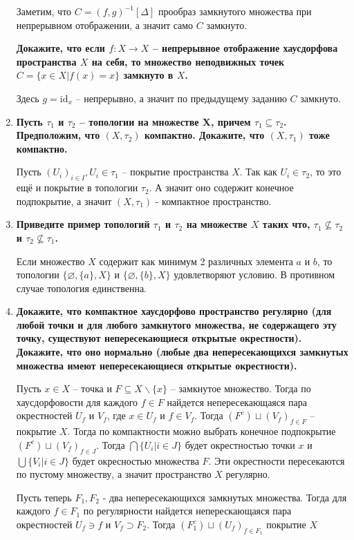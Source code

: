 \documentclass{article}
\begin{document}
\begin{enumerate}
        Заметим, что $C = (f, g)^{-1}[\Delta]$ прообраз замкнутого множества
        при непрерывном отображении, а значит само $C$ замкнуто.\par
        \textbf{Докажите, что если $f:X\longrightarrow X$ – непрерывное
        отображение хаусдорфова пространства $X$ на себя, то множество
        неподвижных точек $C=\{x\in X|f(x)=x\}$ замкнуто в $X$.}\par
        Здесь $g=\text{id}_x$ – непрерывно, а значит по предыдущему заданию $C$
        замкнуто.
    \item \textbf{Пусть $\tau_1$ и $\tau_2$ – топологии на множестве X, причем
        $\tau_1\subseteq \tau_2$. Предположим, что $(X, \tau_2)$ компактно.
        Докажите, что $(X, \tau_1)$ тоже компактно.}\par
        Пусть $(U_i)_{i\in I}, U_i \in \tau_1$ – покрытие пространства  $X$.
        Так как $U_i\in\tau_2$, то это ещё и покрытие в топологии $\tau_2$. А
        значит оно содержит конечное подпокрытие, а значит $(X, \tau_1)$ -
        компактное пространство.
    \item \textbf{Приведите пример топологий $\tau_1$ и $\tau_2$ на множестве
        $X$ таких что, $\tau_1\nsubseteq\tau_2$ и $\tau_2\nsubseteq\tau_1$.}\par
        Если множество $X$ содержит как минимум 2 различных элемента $a$ и $b$,
        то топологии $\{\varnothing, \{a\}, X\}$ и $\{\varnothing, \{b\}, X\}$
        удовлетворяют условию. В противном случае топология единственна.
    \item \textbf{Докажите, что компактное хаусдорфово пространство регулярно
        (для любой точки и для любого замкнутого множества, не содержащего эту
        точку, существуют непересекающиеся открытые окрестности). Докажите, что
        оно нормально (любые два непересекающихся замкнутых множества имеют
        непересекающиеся открытые окрестности).}\par Пусть $x\in X$ – точка и
        $F\subseteq X\backslash\{x\}$ – замкнутое множество. Тогда по хаусдорфовости
        для каждого $f\in F$ найдется непересекающаяся пара окрестностей $U_f$ и
        $V_f$, где $x\in U_f$ и $f\in V_f$. Тогда $(F^c)\sqcup (V_f)_{f\in F}$ –
        покрытие $X$. Тогда по компактности можно выбрать конечное подпокрытие
        $(F^c) \sqcup (V_f)_{f\in J}$. Тогда $\bigcap\{U_i|i\in J\}$ будет
        окрестностью точки $x$ и $\bigcup\{V_i|i\in J\}$ будет окресностью
        множества $F$. Эти окрестности пересекаются по пустому множеству, а
        значит пространство $X$ регулярно.\par
        Пусть теперь $F_1, F_2$ - два непересекающихся замкнутых множества.
        Тогда для каждого $f\in F_1$ по регулярности найдется неперескающаяся
        пара окрестностей $U_f\ni f$ и $V_f\supset F_2$. Тогда $(F_1^c)\sqcup
        (U_f)_{f\in F_1}$ покрытие $X$
\end{enumerate}
\end{document}
